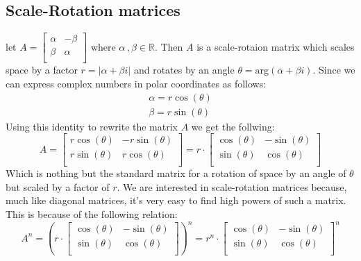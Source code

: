 \documentclass[11pt, a4paper]{article}
\newcommand*{\R}{\ensuremath{\mathbb{R}}}
\begin{document}
\subsection{Scale-Rotation matrices}
let $A = \begin{bmatrix} \alpha & -\beta\\ \beta & \alpha\\ \end{bmatrix}$ where $\alpha\,,\beta \in \R$. Then $A$ is a scale-rotaion matrix which scales space by a factor $r = |\alpha + \beta i|$ and rotates by an angle $\theta = \text{arg}(\alpha + \beta i)$. Since we can express complex numbers in polar coordinates as follows:
\begin{gather*}
  \alpha = r\cos(\theta)\\
  \beta = r\sin(\theta)
\end{gather*} 
Using this identity to rewrite the matrix $A$ we get the follwing:
\begin{equation}
  A =
  \begin{bmatrix}
    r\cos(\theta) & -r\sin(\theta)\\
    r\sin(\theta) & r\cos(\theta)\\
  \end{bmatrix}
  = r \cdot
  \begin{bmatrix}
    \cos(\theta) & -\sin(\theta)\\
    \sin(\theta) & \cos(\theta)\\
  \end{bmatrix}
\end{equation}
Which is nothing but the standard matrix for a rotation of space by an angle of $\theta$ but scaled by a factor of $r$. We are interested in scale-rotation matrices because, much like diagonal matrices, it's very easy to find high powers of such a matrix. This is because of the following relation:
\begin{equation*}
  A^n = \left( r \cdot
  \begin{bmatrix}
    \cos(\theta) & -\sin(\theta)\\
    \sin(\theta) & \cos(\theta)\\
  \end{bmatrix}
  \right)^n
  =
  r^n \cdot
  \begin{bmatrix}
    \cos(\theta) & -\sin(\theta)\\
    \sin(\theta) & \cos(\theta)\\
  \end{bmatrix}^n
\end{equation*}
\end{document}
